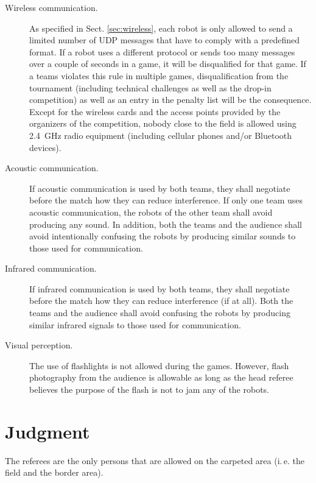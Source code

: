 \documentclass[12pt]{article}
\newcommand{\ie}{\mbox{i.\,e.}\xspace}
\begin{document}
\begin{description}

\item[Wireless communication.] As specified in Sect. \ref{sec:wireless}, each robot is only allowed to send a limited number of UDP messages that have to comply with a predefined format. If a robot uses a different protocol or sends too many messages over a couple of seconds in a game, it will be disqualified for that game. If a teams violates this rule in multiple games, disqualification from the tournament (including technical challenges as well as the drop-in competition) as well as an entry in the penalty list will be the consequence. Except for the wireless cards and the access points provided by the organizers of the competition, nobody close to the field is allowed using 2.4~GHz radio equipment (including cellular phones and/or Bluetooth devices).

\item[Acoustic communication.] If acoustic communication is used by both teams, they shall negotiate before the match how they can reduce interference. If only one team uses acoustic communication, the robots of the other team shall avoid producing any sound. In addition, both the teams and the audience shall avoid intentionally confusing the robots by producing similar sounds to those used for communication.

\item[Infrared communication.] If infrared communication is used by both teams, they shall negotiate before the match how they can reduce interference (if at all). Both the teams and the audience shall avoid confusing the robots by producing similar infrared signals to those used for communication.

\item[Visual perception.] The use of flashlights is not allowed during the games.  However, flash photography from the audience is allowable as long as the head referee believes the purpose of the flash is not to jam any of the robots.

\end{description}


\newpage


\section{Judgment}

The referees are the only persons that are allowed on the carpeted area (\ie the field and the border area).
\end{document}
